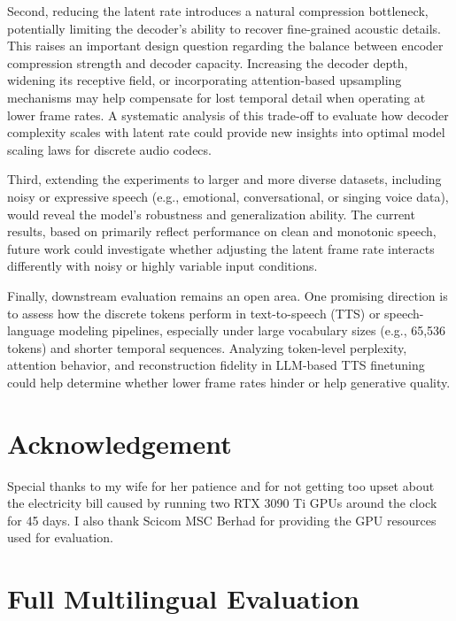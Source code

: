 \documentclass[preprint]{article}
\begin{document}
Second, reducing the latent rate introduces a natural compression bottleneck, potentially limiting the decoder's ability to recover fine-grained acoustic details. This raises an important design question regarding the balance between encoder compression strength and decoder capacity. Increasing the decoder depth, widening its receptive field, or incorporating attention-based upsampling mechanisms may help compensate for lost temporal detail when operating at lower frame rates. A systematic analysis of this trade-off to evaluate how decoder complexity scales with latent rate could provide new insights into optimal model scaling laws for discrete audio codecs.

Third, extending the experiments to larger and more diverse datasets, including noisy or expressive speech (e.g., emotional, conversational, or singing voice data), would reveal the model's robustness and generalization ability. The current results, based on primarily reflect performance on clean and monotonic speech, future work could investigate whether adjusting the latent frame rate interacts differently with noisy or highly variable input conditions.

Finally, downstream evaluation remains an open area. One promising direction is to assess how the discrete tokens perform in text-to-speech (TTS) or speech-language modeling pipelines, especially under large vocabulary sizes (e.g., 65,536 tokens) and shorter temporal sequences. Analyzing token-level perplexity, attention behavior, and reconstruction fidelity in LLM-based TTS finetuning could help determine whether lower frame rates hinder or help generative quality.

\section{Acknowledgement}

Special thanks to my wife for her patience and for not getting too upset about the electricity bill
caused by running two RTX 3090 Ti GPUs around the clock for 45 days. I also thank Scicom MSC Berhad for providing the GPU resources used for evaluation.




\newpage

\appendix
\section{Full Multilingual Evaluation}
\label{appendix:full-eval}
\end{document}
